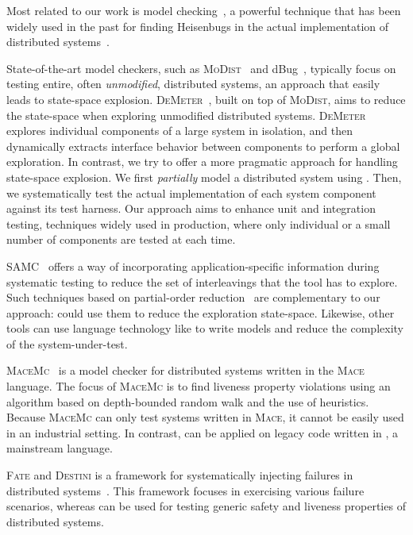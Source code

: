 Most related to our work is model checking~\cite{godefroid1997verisoft}, a powerful technique that has been widely used in the past for finding Heisenbugs in the actual implementation of distributed systems~\cite{killian2007life, yang2009modist, yabandeh2009crystalball, guerraoui2011model, guo2011practical, simsa2011dbug, leesatapornwongsa2014samc}. 

State-of-the-art model checkers, such as \textsc{MoDist}~\cite{yang2009modist} and dBug~\cite{simsa2011dbug}, typically focus on testing entire, often \emph{unmodified}, distributed systems, an approach that easily leads to state-space explosion. \textsc{DeMeter}~\cite{guo2011practical}, built on top of \textsc{MoDist}, aims to reduce the state-space when exploring unmodified distributed systems. \textsc{DeMeter} explores individual components of a large system in isolation, and then dynamically extracts interface behavior between components to perform a global exploration. In contrast, we try to offer a more pragmatic approach for handling state-space explosion. We first \emph{partially} model a distributed system using \psharp. Then, we systematically test the actual implementation of each system component against its \psharp test harness. Our approach aims to enhance unit and integration testing, techniques widely used in production, where only individual or a small number of components are tested at each time.

SAMC~\cite{leesatapornwongsa2014samc} offers a way of incorporating application-specific information during systematic testing to reduce the set of interleavings that the tool has to explore. Such techniques based on partial-order reduction~\cite{godefroid1996partial, flanagan2005dynamic} are complementary to our approach: \psharp could use them to reduce the exploration state-space. Likewise, other tools can use language technology like \psharp to write models and reduce the complexity of the system-under-test.

\textsc{MaceMc}~\cite{killian2007life} is a model checker for distributed systems written in the \textsc{Mace}~\cite{killian2007mace} language. The focus of \textsc{MaceMc} is to find liveness property violations using an algorithm based on depth-bounded random walk and the use of heuristics. Because \textsc{MaceMc} can only test systems written in \textsc{Mace}, it cannot be easily used in an industrial setting. In contrast, \psharp can be applied on legacy code written in \csharp, a mainstream language.

\textsc{Fate} and \textsc{Destini} is a framework for systematically injecting failures in distributed systems~\cite{gunawi2011fate}. This framework focuses in exercising various failure scenarios, whereas \psharp can be used for testing generic safety and liveness properties of distributed systems.

